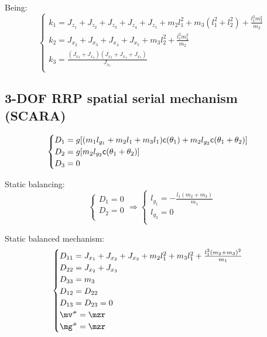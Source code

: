 \documentclass[a4paper,11pt,brazil,fleqn]{article}
\begin{document}
Being:
\begin{equation}
\begin{cases}
k_1 = J_{z_1} + J_{z_2} + J_{z_3} + J_{z_4} + J_{z_5} + m_2 l_1^2 + m_3 (l_1^2 + l_2^2) + \frac{l_1^2 m_3^2}{m_2} \\
k_2 =  J_{x_2} + J_{x_3} + J_{x_4} + J_{x_5} + m_3 l_2^2 + \frac{l_1^2 m_3^2}{m_2}\\
k_3 = \frac{(J_{x_3}+J_{x_4})(J_{x_3}+J_{x_4}+J_{x_5})}{J_{x_5}} \\
\end{cases}
\end{equation}

\subsection{3-DOF RRP spatial serial mechanism (SCARA)} \label{S03-2}

\begin{equation}
\begin{cases}
D_1 = g[ (m_1 l_{g_1} + m_2 l_1 + m_3 l_1 ) \mathsf{c}(\theta_1) + m_2 l_{g_2} \mathsf{c}(\theta_1+\theta_2) ] \\
D_2 = g[ m_2 l_{g_2} \mathsf{c}(\theta_1+\theta_2)  ] \\
D_3 = 0 \\
\end{cases}
\end{equation} 

Static balancing:
\begin{equation}
\begin{cases}
D_1 = 0 \\
D_2 = 0 \\
\end{cases}
\Rightarrow
\begin{cases}
l_{g_1} = -\frac{l_1 (m_2+m_3)}{m_1} \\
l_{g_2} = 0 \\
\end{cases}
\end{equation}

Static balanced mechanism:
\begin{equation}
\begin{cases}
D_{11} = J_{x_1} + J_{x_2} + J_{x_3} + m_2 l_1^2 + m_3 l_1^2 + \frac{l_1^2 (m_2 + m_3)^2}{m_1} \\
D_{22} = J_{x_2} + J_{x_3} \\
D_{33} = m_3 \\
D_{12} = D_{22} \\
D_{13} = D_{23} = 0 \\
\mv\ssh = \mzr \\
\mg\ssh = \mzr
\end{cases}
\end{equation}
\end{document}
